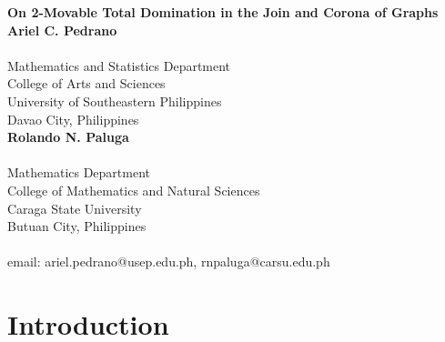 \documentclass[twoside,12pt]{article}
\begin{document}
\textheight=570pt 
\begin{center} {\Large\bf On 2-Movable Total Domination in the Join and Corona of Graphs}
\vskip 1cm {\bf  Ariel C. Pedrano}\\
\
\\Mathematics and Statistics Department\\
College of Arts and Sciences\\
University of Southeastern Philippines\\
Davao City, Philippines\\
\vskip 1cm {\bf  Rolando N. Paluga}\\
\
\\Mathematics Department\\
College of Mathematics and Natural Sciences\\
Caraga State University\\
Butuan City, Philippines\\%
\
\\email: ariel.pedrano@usep.edu.ph, rnpaluga@carsu.edu.ph\\
\end{center}

\begin{abstract}
Let $G$ be a connected graph. A non-empty $T\subseteq V(G)$ is a $2$-\textit{movable total dominating set} of $G$ if $T$ is a total dominating set and for every pair $x,y \in T$, $T \backslash \{x, y\}$ is a total dominating set in $G$, or there exist $u, v \in V(G) \backslash T$ such that $u$ and $v$ are adjacent to $x$ and $y$, respectively, and $(T \backslash \{x,y\}) \cup \{u,v\}$ is a total dominating set in $G$. The $2$-\textit{movable total domination number} of $G$, denoted by $\gamma_{mt}^{2}(G)$, is the minimum cardinality of a 2-movable total dominating set of $G$. A 2-movable total dominating set with cardinality equal to $\gamma_{mt}^{2}(G)$ is called \textit{$\gamma_{mt}^{2}$-set} of $G$. This paper present the 2-movable total domination in the join and corona of graphs.
\end{abstract}
\begingroup
\newtheorem{theorem}{Theorem}[section]
\newtheorem{lemma}[theorem]{Lemma}
\newtheorem{proposition}[theorem]{Proposition}
\newtheorem{corollary}[theorem]{Corollary}
\newtheorem{definition}[theorem]{Definition}
\newtheorem{remark}[theorem]{Remark}
\endgroup
\def\E#1{\left\langle #1 \right\rangle}
\def\diag{\mathop{\fam 0\relax diag}\nolimits}

\section{Introduction}
\end{document}
